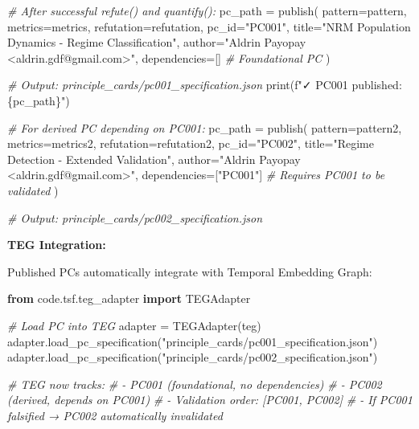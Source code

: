\documentclass[
]{article}
\newenvironment{Shaded}{}{}
\newcommand{\BuiltInTok}[1]{\textcolor[rgb]{0.00,0.50,0.00}{#1}}
\newcommand{\CommentTok}[1]{\textcolor[rgb]{0.38,0.63,0.69}{\textit{#1}}}
\newcommand{\ImportTok}[1]{\textcolor[rgb]{0.00,0.50,0.00}{\textbf{#1}}}
\newcommand{\NormalTok}[1]{#1}
\newcommand{\OperatorTok}[1]{\textcolor[rgb]{0.40,0.40,0.40}{#1}}
\newcommand{\SpecialCharTok}[1]{\textcolor[rgb]{0.25,0.44,0.63}{#1}}
\newcommand{\SpecialStringTok}[1]{\textcolor[rgb]{0.73,0.40,0.53}{#1}}
\newcommand{\StringTok}[1]{\textcolor[rgb]{0.25,0.44,0.63}{#1}}
\begin{document}
\begin{Shaded}
\begin{Highlighting}[]
\CommentTok{\# After successful refute() and quantify():}
\NormalTok{pc\_path }\OperatorTok{=}\NormalTok{ publish(}
\NormalTok{    pattern}\OperatorTok{=}\NormalTok{pattern,}
\NormalTok{    metrics}\OperatorTok{=}\NormalTok{metrics,}
\NormalTok{    refutation}\OperatorTok{=}\NormalTok{refutation,}
\NormalTok{    pc\_id}\OperatorTok{=}\StringTok{"PC001"}\NormalTok{,}
\NormalTok{    title}\OperatorTok{=}\StringTok{"NRM Population Dynamics {-} Regime Classification"}\NormalTok{,}
\NormalTok{    author}\OperatorTok{=}\StringTok{"Aldrin Payopay \textless{}aldrin.gdf@gmail.com\textgreater{}"}\NormalTok{,}
\NormalTok{    dependencies}\OperatorTok{=}\NormalTok{[]  }\CommentTok{\# Foundational PC}
\NormalTok{)}

\CommentTok{\# Output: principle\_cards/pc001\_specification.json}
\BuiltInTok{print}\NormalTok{(}\SpecialStringTok{f"✓ PC001 published: }\SpecialCharTok{\{}\NormalTok{pc\_path}\SpecialCharTok{\}}\SpecialStringTok{"}\NormalTok{)}

\CommentTok{\# For derived PC depending on PC001:}
\NormalTok{pc\_path }\OperatorTok{=}\NormalTok{ publish(}
\NormalTok{    pattern}\OperatorTok{=}\NormalTok{pattern2,}
\NormalTok{    metrics}\OperatorTok{=}\NormalTok{metrics2,}
\NormalTok{    refutation}\OperatorTok{=}\NormalTok{refutation2,}
\NormalTok{    pc\_id}\OperatorTok{=}\StringTok{"PC002"}\NormalTok{,}
\NormalTok{    title}\OperatorTok{=}\StringTok{"Regime Detection {-} Extended Validation"}\NormalTok{,}
\NormalTok{    author}\OperatorTok{=}\StringTok{"Aldrin Payopay \textless{}aldrin.gdf@gmail.com\textgreater{}"}\NormalTok{,}
\NormalTok{    dependencies}\OperatorTok{=}\NormalTok{[}\StringTok{"PC001"}\NormalTok{]  }\CommentTok{\# Requires PC001 to be validated}
\NormalTok{)}

\CommentTok{\# Output: principle\_cards/pc002\_specification.json}
\end{Highlighting}
\end{Shaded}

\textbf{TEG Integration:}

Published PCs automatically integrate with Temporal Embedding Graph:

\begin{Shaded}
\begin{Highlighting}[]
\ImportTok{from}\NormalTok{ code.tsf.teg\_adapter }\ImportTok{import}\NormalTok{ TEGAdapter}

\CommentTok{\# Load PC into TEG}
\NormalTok{adapter }\OperatorTok{=}\NormalTok{ TEGAdapter(teg)}
\NormalTok{adapter.load\_pc\_specification(}\StringTok{"principle\_cards/pc001\_specification.json"}\NormalTok{)}
\NormalTok{adapter.load\_pc\_specification(}\StringTok{"principle\_cards/pc002\_specification.json"}\NormalTok{)}

\CommentTok{\# TEG now tracks:}
\CommentTok{\# {-} PC001 (foundational, no dependencies)}
\CommentTok{\# {-} PC002 (derived, depends on PC001)}
\CommentTok{\# {-} Validation order: [PC001, PC002]}
\CommentTok{\# {-} If PC001 falsified → PC002 automatically invalidated}
\end{Highlighting}
\end{Shaded}
\end{document}
